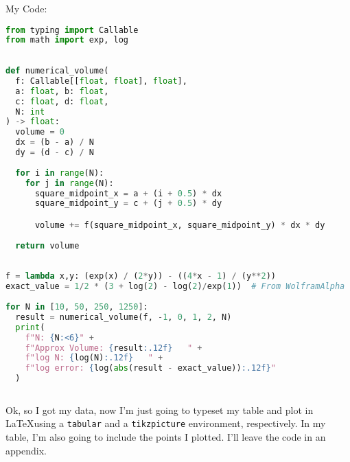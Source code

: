 \documentclass[a4paper,12pt]{report}
\begin{document}
\newpage
{}
\sol My Code:
\begin{lstlisting}[language=Python]
from typing import Callable
from math import exp, log
  
  
def numerical_volume(
  f: Callable[[float, float], float],
  a: float, b: float,
  c: float, d: float,
  N: int
) -> float:
  volume = 0
  dx = (b - a) / N
  dy = (d - c) / N
  
  for i in range(N):
    for j in range(N):
      square_midpoint_x = a + (i + 0.5) * dx
      square_midpoint_y = c + (j + 0.5) * dy

      volume += f(square_midpoint_x, square_midpoint_y) * dx * dy
  
  return volume
  
  
f = lambda x,y: (exp(x) / (2*y)) - ((4*x - 1) / (y**2))
exact_value = 1/2 * (3 + log(2) - log(2)/exp(1))  # From WolframAlpha
  
for N in [10, 50, 250, 1250]:
  result = numerical_volume(f, -1, 0, 1, 2, N)
  print(
    f"N: {N:<6}" +
    f"Approx Volume: {result:.12f}   " +
    f"log N: {log(N):.12f}   " +
    f"log error: {log(abs(result - exact_value)):.12f}"
  )
  
\end{lstlisting}

Ok, so I got my data, now I'm just going to typeset my table and plot in \LaTeX using a \verb|tabular| and a \verb|tikzpicture| environment, respectively. In my table, I'm also going to include the points I plotted. I'll leave the code in an appendix.
\end{document}
